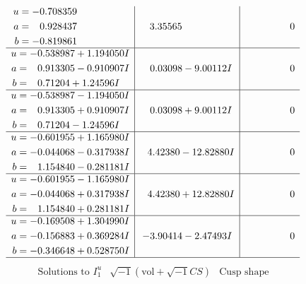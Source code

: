 \documentclass[1p]{elsarticle_modified}
\theoremstyle{definition}
\newcommand{\I}{\sqrt{-1}}
\begin{document}
$$\begin{array}{c|c|c}
\begin{aligned}
u &= -0.708359\phantom{ +0.000000I} \\
a &= \phantom{-}0.928437\phantom{ +0.000000I} \\
b &= -0.819861\phantom{ +0.000000I}\end{aligned}
 & \phantom{-}3.35565\phantom{ +0.000000I} & \phantom{-0.000000 } 0 \\ \hline\begin{aligned}
u &= -0.538987 + 1.194050 I \\
a &= \phantom{-}0.913305 - 0.910907 I \\
b &= \phantom{-}0.71204 + 1.24596 I\end{aligned}
 & \phantom{-}0.03098 - 9.00112 I & \phantom{-0.000000 } 0 \\ \hline\begin{aligned}
u &= -0.538987 - 1.194050 I \\
a &= \phantom{-}0.913305 + 0.910907 I \\
b &= \phantom{-}0.71204 - 1.24596 I\end{aligned}
 & \phantom{-}0.03098 + 9.00112 I & \phantom{-0.000000 } 0 \\ \hline\begin{aligned}
u &= -0.601955 + 1.165980 I \\
a &= -0.044068 - 0.317938 I \\
b &= \phantom{-}1.154840 - 0.281181 I\end{aligned}
 & \phantom{-}4.42380 - 12.82880 I & \phantom{-0.000000 } 0 \\ \hline\begin{aligned}
u &= -0.601955 - 1.165980 I \\
a &= -0.044068 + 0.317938 I \\
b &= \phantom{-}1.154840 + 0.281181 I\end{aligned}
 & \phantom{-}4.42380 + 12.82880 I & \phantom{-0.000000 } 0 \\ \hline\begin{aligned}
u &= -0.169508 + 1.304990 I \\
a &= -0.156883 + 0.369284 I \\
b &= -0.346648 + 0.528750 I\end{aligned}
 & -3.90414 - 2.47493 I & \phantom{-0.000000 } 0\\
 \hline 
 \end{array}$$\newpage$$\begin{array}{c|c|c}  
\text{Solutions to }I^u_{1}& \I (\text{vol} + \sqrt{-1}CS) & \text{Cusp shape}\\

\end{array}$$
\end{document}
